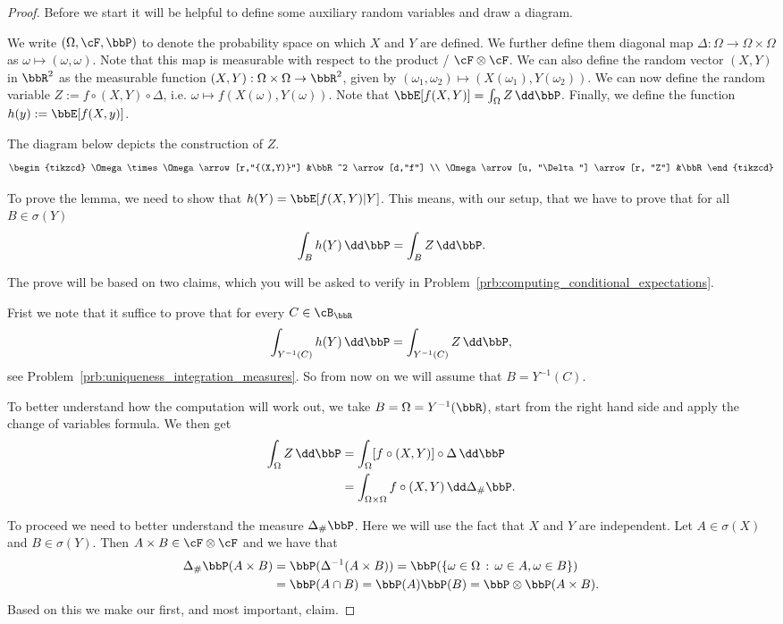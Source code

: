 \begin{proof}
Before we start it will be helpful to define some auxiliary random variables and draw a diagram.

We write $(\Omega, \cF, \bbP)$ to denote the probability space on which $X$ and $Y$ are defined. We further define them diagonal map $\Delta : \Omega \to \Omega \times \Omega$ as $\omega \mapsto (\omega, \omega)$. Note that this map is measurable with respect to the product \sigalg/ $\cF \otimes \cF$. We can also define the random vector $(X,Y)$ in $\bbR^2$ as the measurable function $(X, Y) : \Omega \times \Omega \to \bbR^2$, given by $(\omega_1, \omega_2) \mapsto (X(\omega_1), Y(\omega_2))$. We can now define the random variable $Z := f \circ (X, Y) \circ \Delta$, i.e. $\omega \mapsto f(X(\omega), Y(\omega))$. Note that $\bbE[f(X,Y)] = \int_\Omega Z \, \dd \bbP$. Finally, we define the function $h(y) := \bbE[f(X,y)]$.

The diagram below depicts the construction of $Z$.
\[
\begin{tikzcd}
	\Omega \times \Omega \arrow[r,"{(X,Y)}"] &\bbR^2 \arrow[d,"f"]  \\
	\Omega \arrow[u, "\Delta"] \arrow[r, "Z"] &\bbR
\end{tikzcd}
\]

To prove the lemma, we need to show that $h(Y) = \bbE[f(X,Y)|Y]$. This means, with our setup, that we have to prove that for all $B \in \sigma(Y)$ 
\[
	\int_B h(Y) \, \dd \bbP = \int_B Z \, \dd \bbP.
\]

The prove will be based on two claims, which you will be asked to verify in Problem~\ref{prb:computing_conditional_expectations}.

Frist we note that it suffice to prove that for every $C \in \cB_{\bbR}$
\[
	\int_{Y^{-1}(C)} h(Y) \, \dd \bbP = \int_{Y^{-1}(C)} Z \, \dd \bbP,
\]
see Problem~\ref{prb:uniqueness_integration_measures}. So from now on we will assume that $B = Y^{-1}(C)$.

To better understand how the computation will work out, we take $B = \Omega = Y^{-1}(\bbR)$, start from the right hand side and apply the change of variables formula. We then get
\begin{align*}
	\int_\Omega Z \, \dd \bbP &= \int_\Omega [f \circ (X, Y)] \circ \Delta \, \dd \bbP \\
	&= \int_{\Omega \times \Omega} f \circ (X,Y) \, \dd \Delta_\# \bbP.
\end{align*}

To proceed we need to better understand the measure $\Delta_\# \bbP$. Here we will use the fact that $X$ and $Y$ are independent. Let $A \in \sigma(X)$ and $B \in \sigma(Y)$. Then $A \times B \in \cF \otimes \cF$ and we have that
\begin{align*}
	\Delta_\# \bbP(A \times B) &= \bbP(\Delta^{-1}(A \times B))
		= \bbP(\{\omega \in \Omega \, : \, \omega \in A, \omega \in B\})\\
	&= \bbP(A \cap B) = \bbP(A) \bbP(B) = \bbP\otimes \bbP(A\times B).
\end{align*}
Based on this we make our first, and most important, claim.


\end{proof}
